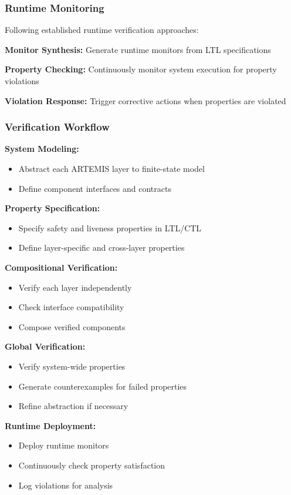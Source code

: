 \documentclass[conference]{IEEEtran}
\begin{document}
\subsubsection{Runtime Monitoring}

Following established runtime verification approaches:

\textbf{Monitor Synthesis:} Generate runtime monitors from LTL specifications

\textbf{Property Checking:} Continuously monitor system execution for property violations

\textbf{Violation Response:} Trigger corrective actions when properties are violated

\subsubsection{Verification Workflow}

\textbf{System Modeling:}
\begin{itemize}
    \item Abstract each ARTEMIS layer to finite-state model
    \item Define component interfaces and contracts
\end{itemize}

\textbf{Property Specification:}
\begin{itemize}
    \item Specify safety and liveness properties in LTL/CTL
    \item Define layer-specific and cross-layer properties
\end{itemize}

\textbf{Compositional Verification:}
\begin{itemize}
    \item Verify each layer independently
    \item Check interface compatibility
    \item Compose verified components
\end{itemize}

\textbf{Global Verification:}
\begin{itemize}
    \item Verify system-wide properties
    \item Generate counterexamples for failed properties
    \item Refine abstraction if necessary
\end{itemize}

\textbf{Runtime Deployment:}
\begin{itemize}
    \item Deploy runtime monitors
    \item Continuously check property satisfaction
    \item Log violations for analysis
\end{itemize}
\end{document}
